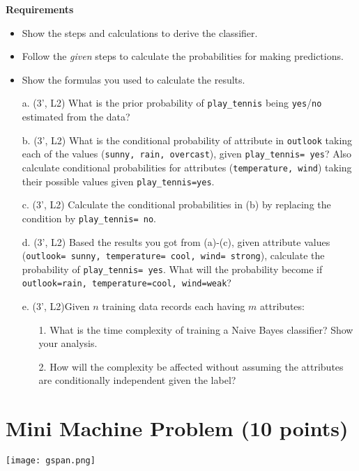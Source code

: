 \textbf{Requirements}
\begin{itemize}
\setlength{\itemsep}{1pt}
\item Show the steps and calculations to derive the classifier.
\item Follow the {\it given} steps to calculate the probabilities for making predictions.
\item Show the formulas you used to calculate the results.
\end{itemize}

\begin{itemize}
    \item[a.]  (3', L2) What is the prior probability of {\tt play\_tennis} being {\tt yes}/{\tt no} estimated from the data?
    \item[b.] (3', L2) What is the conditional probability of attribute in {\tt outlook} taking each of the values ({\tt sunny, rain, overcast}), given {\tt play\_tennis= yes}? Also calculate conditional probabilities for attributes ({\tt temperature, wind}) taking their possible values given {\tt play\_tennis=yes}.
    \item[c.] (3', L2) Calculate the conditional probabilities in (b) by replacing the condition by {\tt play\_tennis= no}.
    \item[d.] (3', L2) Based the results you got from (a)-(c), given attribute values ({\tt outlook= sunny, temperature= cool, wind= strong}), calculate the probability of {\tt play\_tennis= yes}. What will the probability become if {\tt outlook=rain, temperature=cool, wind=weak}?
    \item[e.] (3', L2)Given $n$ training data records each having $m$ attributes:
    \begin{itemize}
        \item[1.] What is the time complexity of training a Naive Bayes classifier? Show your analysis.
        \item[2.] How will the complexity be affected without assuming the attributes are conditionally independent given the label? 
    \end{itemize}  
\end{itemize}



\section{Mini Machine Problem (10 points)}
\texttt{[image: gspan.png]} 

